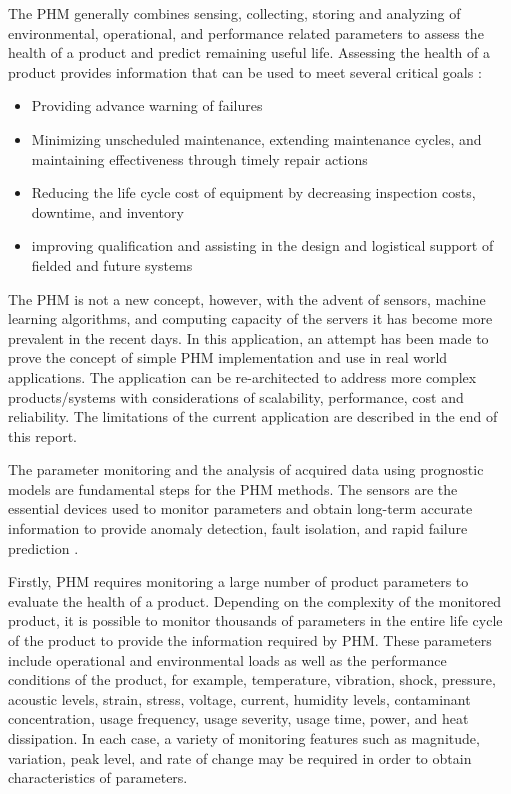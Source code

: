 \documentclass[sigconf]{acmart}
\begin{document}
The PHM generally combines sensing, collecting, storing and analyzing of environmental, operational, and performance related parameters to assess the health of a product and predict remaining useful life. Assessing the health of a product provides information that can be used to meet several critical goals \cite{Shunfeng2010}: 

\begin{itemize}
\item Providing advance warning of failures
\item Minimizing unscheduled maintenance, extending maintenance cycles, and maintaining effectiveness through timely repair actions
\item Reducing the life cycle cost of equipment by decreasing inspection costs, downtime, and inventory
\item improving qualification and assisting in the design and logistical support of fielded and future systems
\end{itemize}

The PHM is not a new concept, however, with the advent of sensors, machine learning algorithms, and computing capacity of the servers it has become more prevalent in the recent days. In this application, an attempt has been made to prove the concept of simple PHM implementation and use in real world applications. The application can be re-architected to address more complex products/systems with considerations of scalability, performance, cost and reliability. The limitations of the current application are described in the end of this report.

The parameter monitoring and the analysis of acquired data using prognostic models are fundamental steps for the PHM methods. The sensors are the essential devices used to monitor parameters and obtain long-term accurate information to provide anomaly detection, fault isolation, and rapid failure prediction \cite{Shunfeng2010}.

Firstly, PHM requires monitoring a large number of product parameters to evaluate the health of a product. Depending on the complexity of the monitored product, it is possible to monitor thousands of parameters in the entire life cycle of the product to provide the information required by PHM. These parameters include operational and environmental loads as well as the performance conditions of the product, for example, temperature, vibration, shock, pressure, acoustic levels, strain, stress, voltage, current, humidity levels, contaminant concentration, usage frequency, usage severity, usage time, power, and heat dissipation. In each case, a variety of monitoring features such as magnitude, variation, peak level, and rate of change may be required in order to obtain characteristics of parameters.
\end{document}
